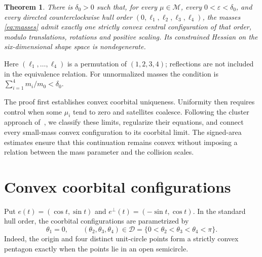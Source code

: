 \documentclass[11pt,a4paper]{article}
\numberwithin{equation}{section}
\newtheorem{theorem}{Theorem}[section]
\theoremstyle{remark}
\newcommand{\M}{\mathcal M}
\newcommand{\D}{\mathcal D}
\newcommand{\eps}{\varepsilon}
\begin{document}
\begin{theorem}\label{thm:main}
There is $\delta_0>0$ such that, for every $\mu\in\M$, every $0<\eps<\delta_0$, and every directed counterclockwise hull order $(0,\ell_1,\ell_2,\ell_3,\ell_4)$, the masses \eqref{eq:masses} admit exactly one strictly convex central configuration of that order, modulo translations, rotations and positive scaling. Its constrained Hessian on the six-dimensional shape space is nondegenerate.
\end{theorem}

Here $(\ell_1,\ldots,\ell_4)$ is a permutation of $(1,2,3,4)$; reflections are not included in the equivalence relation. For unnormalized masses the condition is $\sum_{i=1}^4m_i/m_0<\delta_0$.

The proof first establishes convex coorbital uniqueness. Uniformity then requires control when some $\mu_i$ tend to zero and satellites coalesce. Following the cluster approach of~\cite{Moeckel}, we classify these limits, regularize their equations, and connect every small-mass convex configuration to its coorbital limit. The signed-area estimates ensure that this continuation remains convex without imposing a relation between the mass parameter and the collision scales.

\section{Convex coorbital configurations}\label{sec:coorbital}

Put $e(t)=(\cos t,\sin t)$ and $e^\perp(t)=(-\sin t,\cos t)$. In the standard hull order, the coorbital configurations are parametrized by
\begin{equation}\label{eq:angle-domain}
 \theta_1=0,\qquad
 (\theta_2,\theta_3,\theta_4)\in\D
 =\{0<\theta_2<\theta_3<\theta_4<\pi\}.
\end{equation}
Indeed, the origin and four distinct unit-circle points form a strictly convex pentagon exactly when the points lie in an open semicircle.
\end{document}
